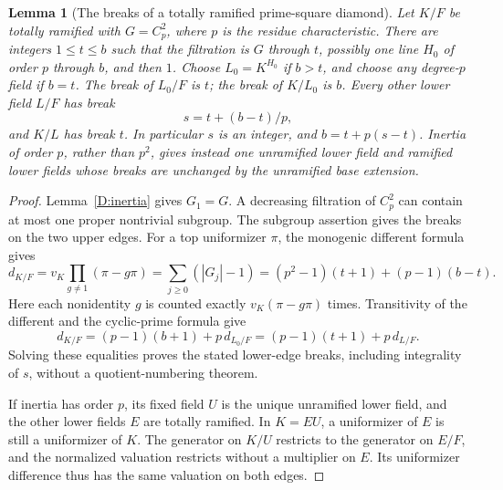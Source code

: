 \documentclass[11pt]{amsart}
\newtheorem{lemma}[theorem]{Lemma}
\theoremstyle{definition}
\theoremstyle{remark}
\begin{document}
\begin{lemma}[The breaks of a totally ramified prime-square diamond]
\label{D:break-ledger}
Let $K/F$ be totally ramified with $G=C_p^2$, where $p$ is the residue
characteristic. There are integers $1\le t\le b$ such that the
filtration is $G$ through $t$, possibly one line $H_0$ of order $p$
through $b$, and then $1$. Choose $L_0=K^{H_0}$ if $b>t$, and
choose any degree-$p$ field if $b=t$. The break of $L_0/F$ is $t$;
the break of $K/L_0$ is $b$. Every other lower field $L/F$ has break
\[
 s=t+(b-t)/p,
\]
and $K/L$ has break $t$. In particular $s$ is an integer, and
$b=t+p(s-t)$. Inertia of order $p$, rather than $p^2$, gives instead
one unramified lower field and ramified lower fields whose breaks are
unchanged by the unramified base extension.
\end{lemma}
\begin{proof}
Lemma~\ref{D:inertia} gives $G_1=G$. A decreasing filtration of
$C_p^2$ can contain at most one proper nontrivial subgroup.
The subgroup assertion gives the breaks on the two upper edges.
For a top uniformizer $\pi$, the monogenic different formula gives
\[
 d_{K/F}=v_K\prod_{g\ne1}(\pi-g\pi)
       =\sum_{j\ge0}(|G_j|-1)
       =(p^2-1)(t+1)+(p-1)(b-t).
\]
Here each nonidentity $g$ is counted exactly
$v_K(\pi-g\pi)$ times. Transitivity of the different and the
cyclic-prime formula give
\[
 d_{K/F}=(p-1)(b+1)+p\,d_{L_0/F}
         =(p-1)(t+1)+p\,d_{L/F}.
\]
Solving these equalities proves the stated lower-edge breaks,
including integrality of $s$, without a quotient-numbering theorem.

If inertia has order $p$, its fixed field $U$ is the unique unramified
lower field, and the other lower fields $E$ are totally ramified.
In $K=EU$, a uniformizer of $E$ is still a uniformizer of $K$.
The generator on $K/U$ restricts to the generator on $E/F$, and the
normalized valuation restricts without a multiplier on $E$.
Its uniformizer difference thus has the same valuation on both edges.
\end{proof}
\end{document}
